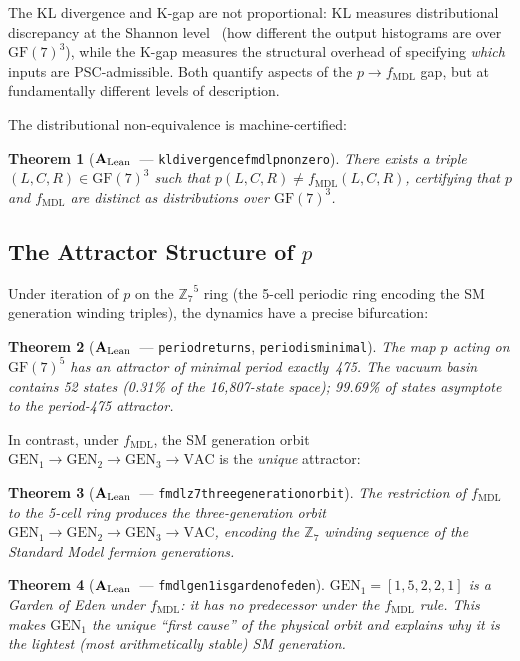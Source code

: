 \documentclass[11pt]{article}
\newtheorem{theorem}{Theorem}[section]
\theoremstyle{remark}
\newcommand{\ZS}{\ensuremath{\mathbb{Z}_7}}
\newcommand{\GF}[1]{\ensuremath{\mathrm{GF}(#1)}}
\newcommand{\lean}[1]{%
  \penalty-100
  \begingroup\def\_{\textunderscore\allowbreak}\texttt{#1}\endgroup}
\newcommand{\fmdl}{\ensuremath{f_{\mathrm{MDL}}}}
\newcommand{\CatAL}{\ensuremath{\textbf{A}_{\rm Lean}}}
\begin{document}
The KL divergence and K-gap are not proportional: KL measures
distributional discrepancy at the Shannon level~\cite{Shannon1948,CoverThomas2006}
(how different the output histograms are over $\GF{7}^3$), while the K-gap
measures the structural overhead of specifying \emph{which} inputs are
PSC-admissible. Both quantify aspects of the $p \to \fmdl{}$ gap, but at
fundamentally different levels of description.

The distributional non-equivalence is machine-certified:
\begin{theorem}[\CatAL\ — \lean{kl\_divergence\_fmdl\_p\_nonzero}]
There exists a triple $(L,C,R) \in \GF{7}^3$ such that
$p(L,C,R) \neq \fmdl{}(L,C,R)$, certifying that $p$ and $\fmdl{}$ are
distinct as distributions over $\GF{7}^3$.
\end{theorem}

\subsection{The Attractor Structure of $p$}
\label{sec:attractor}

Under iteration of $p$ on the $\ZS^5$ ring (the 5-cell periodic ring
encoding the SM generation winding triples), the dynamics have a
precise bifurcation:

\begin{theorem}[\CatAL\ — \lean{period\_475\_returns}, \lean{period\_475\_is\_minimal}]
\label{thm:attractor}
The map $p$ acting on $\GF{7}^5$ has an attractor of minimal period
exactly~475. The vacuum basin contains 52 states (0.31\% of the 16,807-state
space); 99.69\% of states asymptote to the period-475 attractor.
\end{theorem}

In contrast, under \fmdl{}, the SM generation orbit
$\mathrm{GEN}_1 \to \mathrm{GEN}_2 \to \mathrm{GEN}_3 \to \mathrm{VAC}$ is
the \emph{unique} attractor:

\begin{theorem}[\CatAL\ — \lean{fmdl\_z7\_three\_generation\_orbit}]
The restriction of \fmdl{} to the 5-cell ring produces the three-generation
orbit $\mathrm{GEN}_1 \to \mathrm{GEN}_2 \to \mathrm{GEN}_3 \to \mathrm{VAC}$,
encoding the $\ZS$ winding sequence of the Standard Model fermion generations.
\end{theorem}

\begin{theorem}[\CatAL\ — \lean{fmdl\_gen1\_is\_garden\_of\_eden}]
$\mathrm{GEN}_1 = [1,5,2,2,1]$ is a Garden of Eden under \fmdl{}: it has no
predecessor under the \fmdl{} rule. This makes $\mathrm{GEN}_1$ the unique
``first cause'' of the physical orbit and explains why it is the lightest
(most arithmetically stable) SM generation.
\end{theorem}
\end{document}
